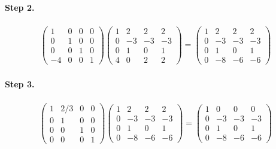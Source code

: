\documentclass[11pt]{article}
\begin{document}
\paragraph{Step 2.}
\begin{eqnarray*}
\begin{pmatrix}
	1 & 0 & 0 & 0\\
	0 & 1 & 0 & 0\\
	0 & 0 & 1 & 0\\
	-4 & 0 & 0 & 1
\end{pmatrix}
\left(\begin{array}{ccc|c}  
	1 & 2 & 2 & 2\\
    0 & -3 & -3 & -3\\
    0 & 1 & 0 & 1\\
    4 & 0 & 2 & 2
\end{array}\right)
=
\left(\begin{array}{ccc|c}  
	1 & 2 & 2 & 2\\
    0 & -3 & -3 & -3\\
    0 & 1 & 0 & 1\\
    0 & -8 & -6 & -6
\end{array}\right)
\end{eqnarray*}

\paragraph{Step 3.}
\begin{eqnarray*}
\begin{pmatrix}
	1 & 2/3 & 0 & 0\\
	0 & 1 & 0 & 0\\
	0 & 0 & 1 & 0\\
	0 & 0 & 0 & 1
\end{pmatrix}
\left(\begin{array}{ccc|c}  
	1 & 2 & 2 & 2\\
    0 & -3 & -3 & -3\\
    0 & 1 & 0 & 1\\
    0 & -8 & -6 & -6
\end{array}\right)
=
\left(\begin{array}{ccc|c}  
	1 & 0 & 0 & 0\\
    0 & -3 & -3 & -3\\
    0 & 1 & 0 & 1\\
    0 & -8 & -6 & -6
\end{array}\right)
\end{eqnarray*}
\end{document}
